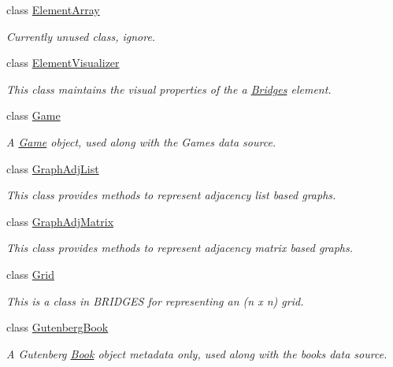 \begin{DoxyCompactItemize}
class \mbox{\hyperlink{classbridges_1_1_element_array}{Element\+Array}}
\begin{DoxyCompactList}\small\item\em Currently unused class, ignore. \end{DoxyCompactList}\item 
class \mbox{\hyperlink{classbridges_1_1_element_visualizer}{Element\+Visualizer}}
\begin{DoxyCompactList}\small\item\em This class maintains the visual properties of the a \mbox{\hyperlink{classbridges_1_1_bridges}{Bridges}} element. \end{DoxyCompactList}\item 
class \mbox{\hyperlink{classbridges_1_1_game}{Game}}
\begin{DoxyCompactList}\small\item\em A \mbox{\hyperlink{classbridges_1_1_game}{Game}} object, used along with the Games data source. \end{DoxyCompactList}\item 
class \mbox{\hyperlink{classbridges_1_1_graph_adj_list}{Graph\+Adj\+List}}
\begin{DoxyCompactList}\small\item\em This class provides methods to represent adjacency list based graphs. \end{DoxyCompactList}\item 
class \mbox{\hyperlink{classbridges_1_1_graph_adj_matrix}{Graph\+Adj\+Matrix}}
\begin{DoxyCompactList}\small\item\em This class provides methods to represent adjacency matrix based graphs. \end{DoxyCompactList}\item 
class \mbox{\hyperlink{classbridges_1_1_grid}{Grid}}
\begin{DoxyCompactList}\small\item\em This is a class in B\+R\+I\+D\+G\+ES for representing an (n x n) grid. \end{DoxyCompactList}\item 
class \mbox{\hyperlink{classbridges_1_1_gutenberg_book}{Gutenberg\+Book}}
\begin{DoxyCompactList}\small\item\em A Gutenberg \mbox{\hyperlink{classbridges_1_1_book}{Book}} object metadata only, used along with the books data source. \end{DoxyCompactList}\item 

\end{DoxyCompactItemize}

